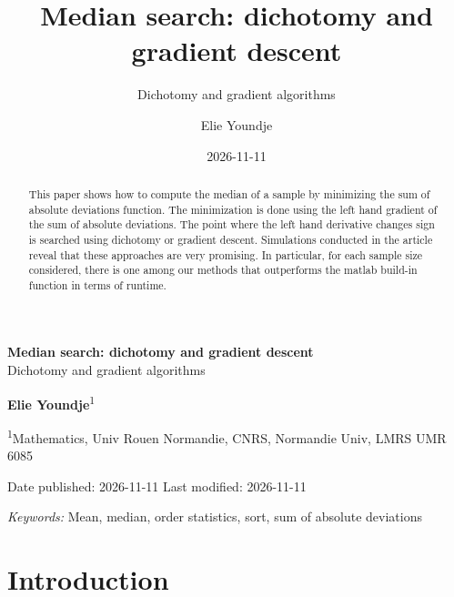 \documentclass[
  11pt,
  a4paper,
]{article}
\title{Median search: dichotomy and gradient descent}
\subtitle{Dichotomy and gradient algorithms}
\author{Elie Youndje}
\date{2026-11-11}
\renewcommand*\contentsname{Table of contents}
\newcommand\contentsname{Table of contents}
\begin{document}

\begin{center}
  {\Large\bfseries Median search: dichotomy and gradient descent}
  \\[.3cm]{\large Dichotomy and gradient algorithms}
\end{center}

\bigskip
\begin{center}
      \textbf{Elie
Youndje}\textsuperscript{1}~\quad
  
  \smallskip
  {\small
      \textsuperscript{1}Mathematics, Univ Rouen Normandie, CNRS,
Normandie Univ, LMRS UMR 6085\quad
    }

  \bigskip

  Date published: 2026-11-11 \quad Last modified: 2026-11-11
  \end{center}

\bigskip
\begin{abstract}
This paper shows how to compute the median of a sample by minimizing the
sum of absolute deviations function. The minimization is done using the
left hand gradient of the sum of absolute deviations. The point where
the left hand derivative changes sign is searched using dichotomy or
gradient descent. Simulations conducted in the article reveal that these
approaches are very promising. In particular, for each sample size
considered, there is one among our methods that outperforms the matlab
build-in function in terms of runtime.
\end{abstract}

\noindent%
{\it Keywords:} Mean, median, order statistics, sort, sum of absolute
deviations
\vfill

\linenumbers


\renewcommand*\contentsname{Contents}
{
\setcounter{tocdepth}{3}
\tableofcontents
}

\section{Introduction}\label{introduction}
\end{document}
